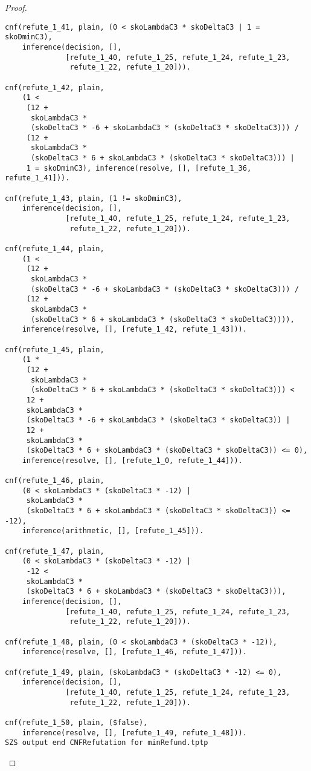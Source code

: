 \begin{proof}
\begin{verbatim}
cnf(refute_1_41, plain, (0 < skoLambdaC3 * skoDeltaC3 | 1 = skoDminC3),
    inference(decision, [],
              [refute_1_40, refute_1_25, refute_1_24, refute_1_23,
               refute_1_22, refute_1_20])).

cnf(refute_1_42, plain,
    (1 <
     (12 +
      skoLambdaC3 *
      (skoDeltaC3 * -6 + skoLambdaC3 * (skoDeltaC3 * skoDeltaC3))) /
     (12 +
      skoLambdaC3 *
      (skoDeltaC3 * 6 + skoLambdaC3 * (skoDeltaC3 * skoDeltaC3))) |
     1 = skoDminC3), inference(resolve, [], [refute_1_36, refute_1_41])).

cnf(refute_1_43, plain, (1 != skoDminC3),
    inference(decision, [],
              [refute_1_40, refute_1_25, refute_1_24, refute_1_23,
               refute_1_22, refute_1_20])).

cnf(refute_1_44, plain,
    (1 <
     (12 +
      skoLambdaC3 *
      (skoDeltaC3 * -6 + skoLambdaC3 * (skoDeltaC3 * skoDeltaC3))) /
     (12 +
      skoLambdaC3 *
      (skoDeltaC3 * 6 + skoLambdaC3 * (skoDeltaC3 * skoDeltaC3)))),
    inference(resolve, [], [refute_1_42, refute_1_43])).

cnf(refute_1_45, plain,
    (1 *
     (12 +
      skoLambdaC3 *
      (skoDeltaC3 * 6 + skoLambdaC3 * (skoDeltaC3 * skoDeltaC3))) <
     12 +
     skoLambdaC3 *
     (skoDeltaC3 * -6 + skoLambdaC3 * (skoDeltaC3 * skoDeltaC3)) |
     12 +
     skoLambdaC3 *
     (skoDeltaC3 * 6 + skoLambdaC3 * (skoDeltaC3 * skoDeltaC3)) <= 0),
    inference(resolve, [], [refute_1_0, refute_1_44])).

cnf(refute_1_46, plain,
    (0 < skoLambdaC3 * (skoDeltaC3 * -12) |
     skoLambdaC3 *
     (skoDeltaC3 * 6 + skoLambdaC3 * (skoDeltaC3 * skoDeltaC3)) <= -12),
    inference(arithmetic, [], [refute_1_45])).

cnf(refute_1_47, plain,
    (0 < skoLambdaC3 * (skoDeltaC3 * -12) |
     -12 <
     skoLambdaC3 *
     (skoDeltaC3 * 6 + skoLambdaC3 * (skoDeltaC3 * skoDeltaC3))),
    inference(decision, [],
              [refute_1_40, refute_1_25, refute_1_24, refute_1_23,
               refute_1_22, refute_1_20])).

cnf(refute_1_48, plain, (0 < skoLambdaC3 * (skoDeltaC3 * -12)),
    inference(resolve, [], [refute_1_46, refute_1_47])).

cnf(refute_1_49, plain, (skoLambdaC3 * (skoDeltaC3 * -12) <= 0),
    inference(decision, [],
              [refute_1_40, refute_1_25, refute_1_24, refute_1_23,
               refute_1_22, refute_1_20])).

cnf(refute_1_50, plain, ($false),
    inference(resolve, [], [refute_1_49, refute_1_48])).
SZS output end CNFRefutation for minRefund.tptp
\end{verbatim}


\end{proof}
